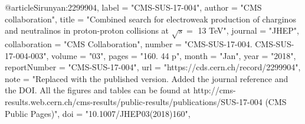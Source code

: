 @article{Sirunyan:2299904,
      label          = "CMS-SUS-17-004",
      author        = "{CMS collaboration}",
      title         = "{Combined search for electroweak production of charginos
                       and neutralinos in proton-proton collisions at $\sqrt{s} =$
                       13 TeV}",
      journal       = "JHEP",
      collaboration = "CMS Collaboration",
      number        = "CMS-SUS-17-004. CMS-SUS-17-004-003",
      volume        = "03",
      pages         = "160. 44 p",
      month         = "Jan",
      year          = "2018",
      reportNumber  = "CMS-SUS-17-004",
      url           = "https://cds.cern.ch/record/2299904",
      note          = "Replaced with the published version. Added the journal
                       reference and the DOI. All the figures and tables can be
                       found at
                       http://cms-results.web.cern.ch/cms-results/public-results/publications/SUS-17-004
                       (CMS Public Pages)",
      doi           = "10.1007/JHEP03(2018)160",
}

